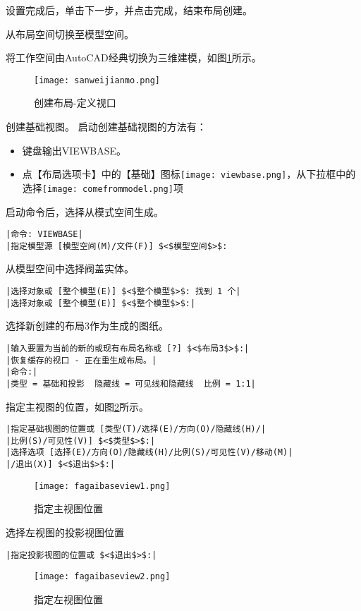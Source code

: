 \begin{procedure}
设置完成后，单击下一步，并点击完成，结束布局创建。
\item 从布局空间切换至模型空间。
\item 将工作空间由AutoCAD经典切换为三维建模，如图\ref{fig:sanweijianmo}所示。
\begin{figure}[htbp]
\centering
\texttt{[image: sanweijianmo.png]}
\caption{创建布局-定义视口}\label{fig:sanweijianmo}
\end{figure}
\item 创建基础视图。
启动创建基础视图的方法有：
\begin{itemize}
\item 键盘输出VIEWBASE。
\item 点【布局选项卡】中的【基础】图标\texttt{[image: viewbase.png]}，从下拉框中的选择\texttt{[image: comefrommodel.png]}项
\end{itemize}
\newpage
启动命令后，选择从模式空间生成。
\begin{lstlisting}
|命令: VIEWBASE|
|指定模型源 [模型空间(M)/文件(F)] $<$模型空间$>$:
\end{lstlisting}
从模型空间中选择阀盖实体。
\begin{lstlisting}
|选择对象或 [整个模型(E)] $<$整个模型$>$: 找到 1 个|
|选择对象或 [整个模型(E)] $<$整个模型$>$:|
\end{lstlisting}
选择新创建的布局3作为生成的图纸。
\begin{lstlisting}
|输入要置为当前的新的或现有布局名称或 [?] $<$布局3$>$:|
|恢复缓存的视口 - 正在重生成布局。|
|命令:|
|类型 = 基础和投影  隐藏线 = 可见线和隐藏线  比例 = 1:1|
\end{lstlisting}
指定主视图的位置，如图\ref{fig:fagaibaseview1}所示。
\begin{lstlisting}
|指定基础视图的位置或 [类型(T)/选择(E)/方向(O)/隐藏线(H)/|
|比例(S)/可见性(V)] $<$类型$>$:|
|选择选项 [选择(E)/方向(O)/隐藏线(H)/比例(S)/可见性(V)/移动(M)|
|/退出(X)] $<$退出$>$:|
\end{lstlisting}
\begin{figure}[htbp]
\centering
\texttt{[image: fagaibaseview1.png]}
\caption{指定主视图位置}\label{fig:fagaibaseview1}
\end{figure}
选择左视图的投影视图位置
\begin{lstlisting}
|指定投影视图的位置或 $<$退出$>$:|
\end{lstlisting}
\begin{figure}[htbp]
\centering
\texttt{[image: fagaibaseview2.png]}
\caption{指定左视图位置}\label{fig:fagaibaseview2}

\end{figure}
\end{procedure}
